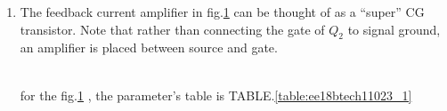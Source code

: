 \begin{enumerate}[label=\thesection.\arabic*.,ref=\thesection.\theenumi]

\item
\label{Question_1_ee18btech11023}
The feedback current amplifier in fig.\ref{fig:Original ckt1} can
be thought of as a “super” CG transistor. Note that rather than
connecting the gate of $Q_2$ to signal ground, an amplifier is
placed between source and gate.
\begin{figure}[!ht]
	\begin{center}
			\resizebox{\columnwidth}{!}{}
	\end{center}
\caption{}
\label{fig:Original ckt1}
\end{figure}
\\for the fig.\ref{fig:Original ckt1} , the parameter's  table is\;\;\;\;\; TABLE.\ref{table:ee18btech11023_1}
\begin{table}[]
    \centering
  	\resizebox{\columnwidth}{!}{}
    \caption{}
    \label{table:ee18btech11023_1}
\end{table}


\end{enumerate}
